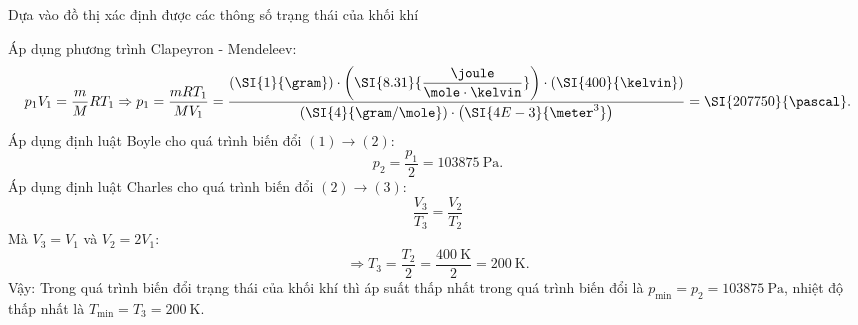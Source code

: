 \begin{dang}{Dựa vào đồ thị xác định được các thông số trạng thái của khối khí}
{{\begin{enumerate}[label=\alph*)]
		\end{enumerate}
		Áp dụng phương trình Clapeyron - Mendeleev:
		$$p_1V_1=\dfrac{m}{M}RT_1\Rightarrow p_1=\dfrac{mRT_1}{M V_1}=\dfrac{\left(\SI{1}{\gram}\right)\cdot\left(\SI{8.31}{\dfrac{\joule}{\mole\cdot\kelvin}}\right)\cdot\left(\SI{400}{\kelvin}\right)}{\left(\SI{4}{\gram/\mole}\right)\cdot\left(\SI{4E-3}{\meter^3}\right)}=\SI{207750}{\pascal}.$$
		Áp dụng định luật Boyle cho quá trình biến đổi $(1)\rightarrow(2)$:
		$$p_2=\dfrac{p_1}{2}=\SI{103875}{\pascal}.$$
		Áp dụng định luật Charles cho quá trình biến đổi $(2)\rightarrow(3)$:
		$$\dfrac{V_3}{T_3}=\dfrac{V_2}{T_2}$$
		Mà $V_3=V_1$ và $V_2=2V_1$:
		$$\Rightarrow T_3=\dfrac{T_2}{2}=\dfrac{\SI{400}{\kelvin}}{2}=\SI{200}{\kelvin}.$$
		Vậy: Trong quá trình biến đổi trạng thái của khối khí thì áp suất thấp nhất trong quá trình biến đổi là $p_\text{min}=p_2=\SI{103875}{\pascal}$, nhiệt độ thấp nhất là $T_\text{min}=T_3=\SI{200}{\kelvin}$.
	}}
	

\end{dang}

